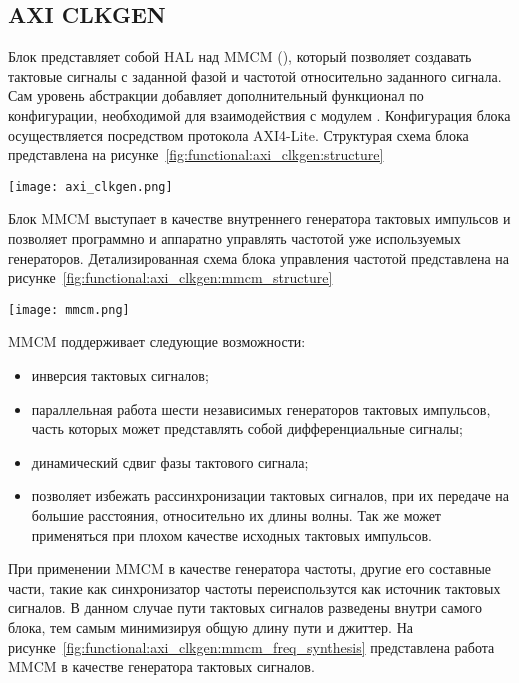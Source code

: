 \subsection{AXI CLKGEN}
\label{sec:functional:axi_clkgen}

Блок  представляет собой HAL над MMCM (),
который позволяет создавать тактовые сигналы с заданной фазой и частотой относительно заданного
сигнала. Сам уровень абстракции добавляет дополнительный функционал по конфигурации, необходимой
для взаимодействия с модулем . Конфигурация блока осуществляется посредством
протокола AXI4-Lite. Структурая схема блока представлена на рисунке~\ref{fig:functional:axi_clkgen:structure}

\begin{center}
  \centering
  \texttt{[image: axi\_clkgen.png]}
  \label{fig:functional:axi_clkgen:structure}
\end{center}

Блок MMCM выступает в качестве внутреннего генератора тактовых импульсов и позволяет
программно и аппаратно управлять частотой уже используемых генераторов. Детализированная схема
блока управления частотой представлена на рисунке~\ref{fig:functional:axi_clkgen:mmcm_structure}

\begin{center}
  \centering
  \texttt{[image: mmcm.png]}
  \label{fig:functional:axi_clkgen:mmcm_structure}
\end{center}


MMCM поддерживает следующие возможности:
\begin{itemize}
  \item инверсия тактовых сигналов;
  \item параллельная работа шести независимых генераторов тактовых импульсов, часть которых
    может представлять собой дифференциальные сигналы;
  \item динамический сдвиг фазы тактового сигнала;
  \item позволяет избежать рассинхронизации тактовых сигналов, при их передаче на большие
    расстояния, относительно их длины волны. Так же может применяться при плохом качестве
    исходных тактовых импульсов.
\end{itemize}

При применении MMCM в качестве генератора частоты, другие его составные части, такие как
синхронизатор частоты переиспользутся как источник тактовых сигналов. В данном случае
пути тактовых сигналов разведены внутри самого блока, тем самым минимизируя общую длину пути
и джиттер. На рисунке~\ref{fig:functional:axi_clkgen:mmcm_freq_synthesis} представлена
работа MMCM в качестве генератора тактовых сигналов.

